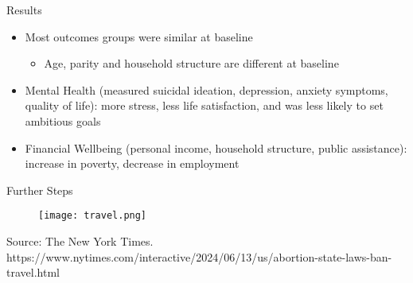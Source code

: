 \documentclass{beamer}
\begin{document}
\begin{frame}{Results}
\begin{itemize}
    \item Most outcomes groups were similar at baseline
    \begin{itemize}
        \item Age, parity and household structure are different at baseline \end{itemize}
\end{itemize}    
\begin{itemize}
    \item Mental Health (measured suicidal ideation, depression, anxiety symptoms, quality of life): more stress, less life satisfaction, and was less likely to set ambitious goals
\end{itemize}

\begin{itemize}
    \item Financial Wellbeing (personal income, household structure, public assistance): increase in poverty, decrease in employment
\end{itemize}
\end{frame}

\begin{frame}{Further Steps}

\begin{figure}
        \centering
        \texttt{[image: travel.png]}
    \end{figure}

\tiny Source: The New York Times. https://www.nytimes.com/interactive/2024/06/13/us/abortion-state-laws-ban-travel.html 
\end{frame}
\end{document}

